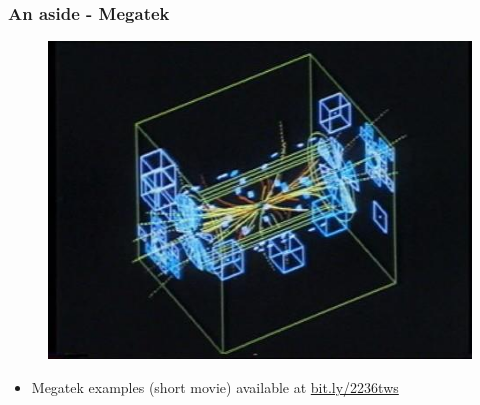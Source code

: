\documentclass[xcolor=table]{beamer}
\begin{document}
\begin{frame}
\frametitle{An aside - Megatek}
\fontsize{10pt}{12}\selectfont

\begin{figure}[h]
\centering
\includegraphics[height=0.6\textheight]{images/megatek.jpg}
\end{figure}

\begin{itemize}
\item Megatek examples (short movie) available at \url{bit.ly/2236tws}
\end{itemize}

\end{frame}

\end{document}
